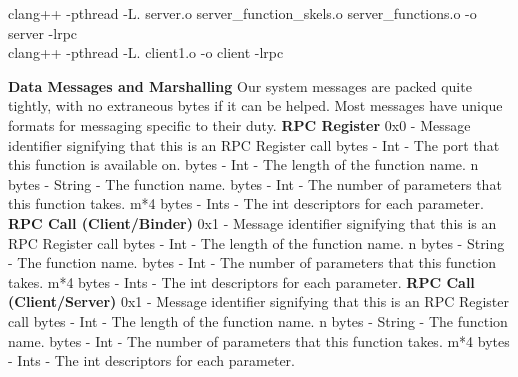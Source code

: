 \documentclass[]{article}
\begin{document}
\begin{center}
clang++ -pthread -L. server.o server\_function\_skels.o server\_functions.o -o server -lrpc\\
clang++ -pthread -L. client1.o -o client -lrpc
\end{center}
\noindent
{\bf Data Messages and Marshalling}\newline
Our system messages are packed quite tightly, with no extraneous bytes if it can be helped. Most messages have unique formats for messaging specific to their duty.
\newline\newline
{\bf RPC Register}\newline
0x0 - Message identifier signifying that this is an RPC Register call bytes - Int - The port that this function is available on. bytes - Int - The length of the function name.\newline
n bytes - String - The function name. bytes - Int - The number of parameters that this function takes.\newline
m*4 bytes - Ints - The int descriptors for each parameter.\newline\newline
{\bf RPC Call (Client/Binder)}\newline
0x1 - Message identifier signifying that this is an RPC Register call bytes - Int - The length of the function name.\newline
n bytes - String - The function name. bytes - Int - The number of parameters that this function takes.\newline
m*4 bytes - Ints - The int descriptors for each parameter.\newline\newline
{\bf RPC Call (Client/Server)}\newline
0x1 - Message identifier signifying that this is an RPC Register call bytes - Int - The length of the function name.\newline
n bytes - String - The function name. bytes - Int - The number of parameters that this function takes.\newline
m*4 bytes - Ints - The int descriptors for each parameter.\newline
\end{document}
